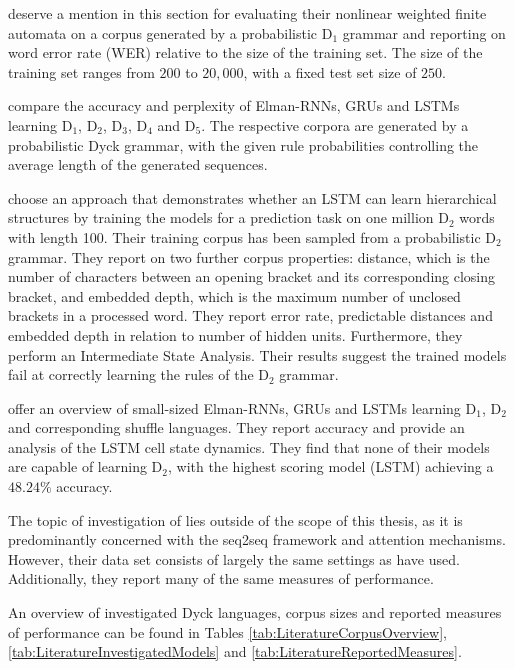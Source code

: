 \cite{Li2018} deserve a mention in this section for evaluating their nonlinear weighted finite automata on a corpus generated by a probabilistic D$_1$ grammar and reporting on word error rate (WER) relative to the size of the training set. The size of the training set ranges from $200$ to $20,000$, with a fixed test set size of $250$.

\cite{Skachkova2018} compare the accuracy and perplexity of Elman-RNNs, GRUs and LSTMs learning D$_1$, D$_2$, D$_3$, D$_4$ and D$_5$. The respective corpora are generated by a probabilistic Dyck grammar, with the given rule probabilities controlling the average length of the generated sequences.

\cite{Sennhauser2018} choose an approach that demonstrates whether an LSTM can learn hierarchical structures by training the models for a prediction task on one million D$_2$ words with length 100. Their training corpus has been sampled from a probabilistic D$_2$ grammar. They report on two further corpus properties: distance, which is the number of characters between an opening bracket and its corresponding closing bracket, and embedded depth, which is the maximum number of unclosed brackets in a processed word. They report error rate, predictable distances and embedded depth in relation to number of hidden units. Furthermore, they perform an Intermediate State Analysis. Their results suggest the trained models fail at correctly learning the rules of the D$_2$ grammar.

\cite{Suzgun2019} offer an overview of small-sized Elman-RNNs, GRUs and LSTMs learning D$_1$, D$_2$ and corresponding shuffle languages. They report accuracy and provide an analysis of the LSTM cell state dynamics. They find that none of their models are capable of learning D$_2$, with the highest scoring model (LSTM) achieving a $48.24\%$ accuracy.

The topic of investigation of \cite{Yu2019} lies outside of the scope of this thesis, as it is predominantly concerned with the seq2seq framework and attention mechanisms. However, their data set consists of largely the same settings as \cite{Sennhauser2018} have used. Additionally, they report many of the same measures of performance.

An overview of investigated Dyck languages, corpus sizes and reported measures of performance can be found in Tables \ref{tab:LiteratureCorpusOverview}, \ref{tab:LiteratureInvestigatedModels} and \ref{tab:LiteratureReportedMeasures}.

